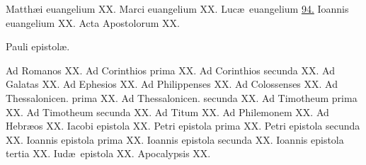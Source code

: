 \documentclass[a5paper,10pt]{book}
\def\ae{æ}
\begin{document}
\begin{multicols}{2}
\par \noindent Matth\ae i euangelium \hfill XX.
\newline Marci euangelium \hfill XX.
\newline Luc\ae \ euangelium \hfill \hyperlink{page.94}{94.}
\newline Ioannis euangelium \hfill XX.
\newline Acta Apostolorum \hfill XX.
\newline \vspace{-1.75em}
\begin{center}
\color{red} Pauli epistol\ae .
\end{center}
\vspace{-.75em}
\par\noindent Ad Romanos \hfill XX.
\newline Ad Corinthios prima \hfill XX.
\newline Ad Corinthios secunda \hfill XX.
\newline Ad Galatas \hfill XX.
\newline Ad Ephesios \hfill XX.
\newline Ad Philippenses \hfill XX.
\newline Ad Colossenses \hfill XX.
\newline Ad Thessalonicen. prima \hfill XX.
\newline Ad Thessalonicen. secunda \hfill XX.
\newline Ad Timotheum prima \hfill XX.
\newline Ad Timotheum secunda \hfill XX.
\newline Ad Titum \hfill XX.
\newline Ad Philemonem \hfill XX.
\newline Ad Hebr\ae os \hfill XX.
\newline Iacobi epistola \hfill XX.
\newline Petri epistola prima \hfill XX.
\newline Petri epistola secunda \hfill XX.
\newline Ioannis epistola prima \hfill XX.
\newline Ioannis epistola secunda \hfill XX.
\newline Ioannis epistola tertia \hfill XX.
\newline Iud\ae \ epistola \hfill XX.
\newline Apocalypsis \hfill XX.
\end{multicols}
\end{document}
